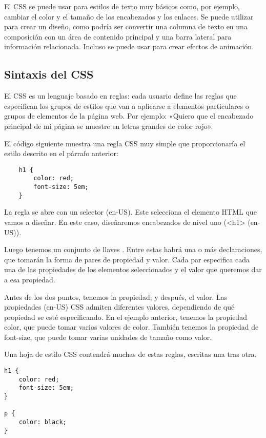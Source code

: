 \begin{enumerate}
El CSS se puede usar para estilos de texto muy básicos como, por ejemplo, cambiar el color y el tamaño de los encabezados y los enlaces. Se puede utilizar para crear un diseño, como podría ser convertir una columna de texto en una composición con un área de contenido principal y una barra lateral para información relacionada. Incluso se puede usar para crear efectos de animación.

\subsection{Sintaxis del CSS}
El CSS es un lenguaje basado en reglas: cada usuario define las reglas que especifican los grupos de estilos que van a aplicarse a elementos particulares o grupos de elementos de la página web. Por ejemplo: «Quiero que el encabezado principal de mi página se muestre en letras grandes de color rojo».

El código siguiente muestra una regla CSS muy simple que proporcionaría el estilo descrito en el párrafo anterior:

\begin{lstlisting}
	h1 {
		color: red;
		font-size: 5em;
	}
\end{lstlisting}

La regla se abre con un selector (en-US). Este selecciona el elemento HTML que vamos a diseñar. En este caso, diseñaremos encabezados de nivel uno (<h1> (en-US)).

Luego tenemos un conjunto de llaves { }. Entre estas habrá una o más declaraciones, que tomarán la forma de pares de propiedad y valor. Cada par especifica cada una de las propiedades de los elementos seleccionados y el valor que queremos dar a esa propiedad.

Antes de los dos puntos, tenemos la propiedad; y después, el valor. Las propiedades (en-US) CSS admiten diferentes valores, dependiendo de qué propiedad se esté especificando. En el ejemplo anterior, tenemos la propiedad color, que puede tomar varios valores de color. También tenemos la propiedad de font-size, que puede tomar varias unidades de tamaño como valor.

Una hoja de estilo CSS contendrá muchas de estas reglas, escritas una tras otra.

\begin{lstlisting}
h1 {
	color: red;
	font-size: 5em;
}

p {
	color: black;
}
\end{lstlisting}


\end{enumerate}
